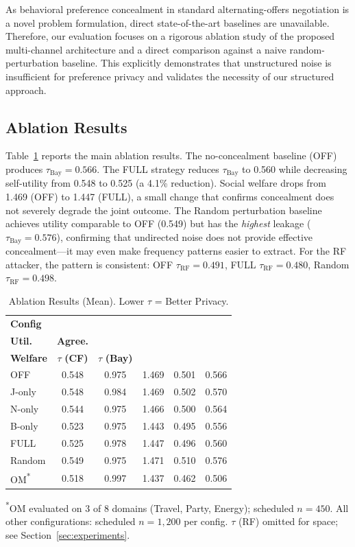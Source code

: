 \documentclass[runningheads]{llncs}
\begin{document}
As behavioral preference concealment in standard alternating-offers negotiation is a novel problem formulation, direct state-of-the-art baselines are unavailable. Therefore, our evaluation focuses on a rigorous ablation study of the proposed multi-channel architecture and a direct comparison against a naive random-perturbation baseline. This explicitly demonstrates that unstructured noise is insufficient for preference privacy and validates the necessity of our structured approach.

\subsection{Ablation Results}

Table~\ref{tab:ablation} reports the main ablation results.
The no-concealment baseline (OFF) produces $\tau_{\text{Bay}} = 0.566$. The FULL strategy reduces $\tau_{\text{Bay}}$ to 0.560 while decreasing self-utility from 0.548 to 0.525 (a 4.1\% reduction). Social welfare drops from 1.469 (OFF) to 1.447 (FULL), a small change that confirms concealment does not severely degrade the joint outcome. The Random perturbation baseline achieves utility comparable to OFF (0.549) but has the \emph{highest} leakage ($\tau_{\text{Bay}} = 0.576$), confirming that undirected noise does not provide effective concealment---it may even make frequency patterns easier to extract. For the RF attacker, the pattern is consistent: OFF $\tau_{\text{RF}} = 0.491$, FULL $\tau_{\text{RF}} = 0.480$, Random $\tau_{\text{RF}} = 0.498$.

\begin{table}[t]
\centering
\caption{Ablation Results (Mean). Lower $\tau$ = Better Privacy.}
\label{tab:ablation}
\scriptsize
\renewcommand{\arraystretch}{1.12}
\setlength{\tabcolsep}{2.7pt}
\begin{tabular}{@{}lccccc@{}}
\toprule
\textbf{Config} & \shortstack{\textbf{Self}\\\textbf{Util.}} & \textbf{Agree.} & \shortstack{\textbf{Soc.}\\\textbf{Welfare}} & $\tau$ \textbf{(CF)} & $\tau$ \textbf{(Bay)} \\
\midrule
OFF      & 0.548 & 0.975 & 1.469 & 0.501 & 0.566 \\
J-only   & 0.548 & 0.984 & 1.469 & 0.502 & 0.570 \\
N-only   & 0.544 & 0.975 & 1.466 & 0.500 & 0.564 \\
B-only   & 0.523 & 0.975 & 1.443 & 0.495 & 0.556 \\
FULL     & 0.525 & 0.978 & 1.447 & 0.496 & 0.560 \\
Random   & 0.549 & 0.975 & 1.471 & 0.510 & 0.576 \\
OM\textsuperscript{*} & 0.518 & 0.997 & 1.437 & 0.462 & 0.506 \\
\bottomrule
\end{tabular}
\parbox{\textwidth}{\vspace{2pt}\footnotesize \textsuperscript{*}OM evaluated on 3 of 8 domains (Travel, Party, Energy); scheduled $n=450$. All other configurations: scheduled $n=1{,}200$ per config. $\tau$ (RF) omitted for space; see Section~\ref{sec:experiments}.}
\end{table}
\end{document}
